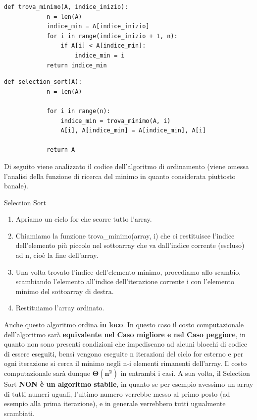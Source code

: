 \documentclass[12pt]{report}
\begin{document}
    \begin{lstlisting}[caption={Funzione ausiliaria "trova\_minimo"}]
    	def trova_minimo(A, indice_inizio):
    		n = len(A)
    		indice_min = A[indice_inizio]
    		for i in range(indice_inizio + 1, n):
    			if A[i] < A[indice_min]:
    				indice_min = i
    		return indice_min
    \end{lstlisting}
    
    \begin{lstlisting}[caption={Selection Sort}]
    	def selection_sort(A):
    		n = len(A)
    		
    		for i in range(n):
    			indice_min = trova_minimo(A, i)
    			A[i], A[indice_min] = A[indice_min], A[i]
    			
    		return A
    \end{lstlisting}
    		
    Di seguito viene analizzato il codice dell'algoritmo di ordinamento (viene omessa l'analisi della funzione di ricerca del minimo in quanto considerata piuttosto banale).
    \begin{algoritmo}{Selection Sort}{}
    			
    	\begin{enumerate}
    				
    		\item Apriamo un ciclo for che scorre tutto l’array.
    
    		\item Chiamiamo la funzione trova\_minimo(array, i) che ci restituisce l’indice dell’elemento più piccolo nel sottoarray che va dall’indice corrente (escluso) ad n, cioè la fine dell’array.
    
    		\item Una volta trovato l’indice dell’elemento minimo, procediamo allo scambio, scambiando l’elemento all’indice dell’iterazione corrente i con l’elemento minimo del sottoarray di destra.
    
    		\item Restituiamo l’array ordinato.
    				
    	\end{enumerate}
    			
    \end{algoritmo}
    		
    Anche questo algoritmo ordina \textbf{in loco}.
    In questo caso il costo computazionale dell’algoritmo sarà \textbf{equivalente nel Caso migliore e nel Caso peggiore}, in quanto non sono presenti condizioni che impediscano ad alcuni blocchi di codice di essere eseguiti, bensì vengono eseguite n iterazioni del ciclo for esterno e per ogni iterazione si cerca il minimo negli n-i elementi rimanenti dell’array. Il costo computazionale sarà dunque $\mathbf{\Theta(n^2)}$ in entrambi i casi.
    A sua volta, il Selection Sort \textbf{NON è un algoritmo stabile}, in quanto se per esempio avessimo un array di tutti numeri uguali, l’ultimo numero verrebbe messo al primo posto (ad esempio alla prima iterazione), e in generale verrebbero tutti ugualmente scambiati.
    	
\end{document}
